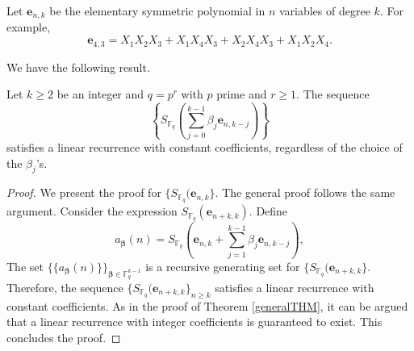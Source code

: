 Let $\boldsymbol{e}_{n,k}$ be the elementary symmetric polynomial in $n$ variables of degree $k$. For example,
\begin{equation}
\boldsymbol{e}_{4,3} = X_1 X_2 X_3+X_1 X_4 X_3+X_2 X_4 X_3+X_1 X_2 X_4.
\end{equation}

We have the following result.

\begin{theorem}
\label{MoregeneralTHMSymmetric}
 Let $k\geq 2$ be an integer and $q=p^r$ with $p$ prime and $r\geq 1$.  The sequence 
\begin{equation}
\left\{ S_{\mathbb{F}_q}\left(\sum _{j=0}^{k-1} \beta_j \boldsymbol{e}_{n,k-j}\right)\right\}
\end{equation}
satisfies a linear recurrence with constant coefficients, regardless of the choice of the $\beta_j$'s.
\end{theorem}

\begin{proof}
We present the proof for $\{S_{\mathbb{F}_q}(\boldsymbol{e}_{n,k}\}$.  The general proof follows the same argument. Consider the expression $S_{\mathbb{F}_q}(\boldsymbol{e}_{n+k,k})$.  Define
\begin{equation}
 \label{generatingseqsSym}
  a_{\boldsymbol{\beta}}(n)=S_{\mathbb{F}_q}\left(\boldsymbol{e}_{n,k}+\sum _{j=1}^{k-1} \beta_j \boldsymbol{e}_{n,k-j}\right),
 \end{equation}
The set $\{\{a_{\boldsymbol{\beta}}(n)\}\}_{\boldsymbol{\beta}\in \mathbb{F}_q^{k-1}}$ is a recursive generating set for $\{S_{\mathbb{F}_q}(\boldsymbol{e}_{n+k,k}\}$.  Therefore, the sequence 
$\{S_{\mathbb{F}_q}(\boldsymbol{e}_{n+k,k}\}_{n\geq k}$ satisfies a linear recurrence with constant coefficients.  As in the proof of Theorem \ref{generalTHM}, it can be argued that a linear recurrence with 
integer coefficients is guaranteed to exist.  This concludes the proof.
\end{proof}

